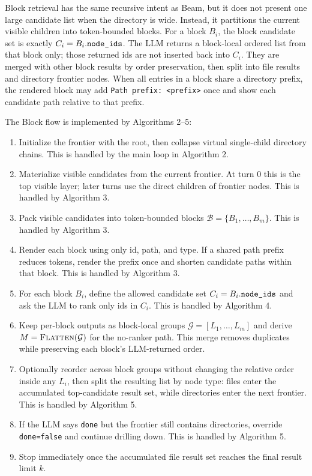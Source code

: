 \documentclass{article}
\begin{document}
Block retrieval has the same recursive intent as Beam, but it does not present
one large candidate list when the directory is wide. Instead, it partitions the
current visible children into token-bounded blocks. For a block $B_i$, the block
candidate set is exactly $C_i = B_i.\text{\texttt{node\_ids}}$. The LLM returns a
block-local ordered list from that block only; those returned ids are not
inserted back into $C_i$. They are merged with other block results by order
preservation, then split into file results and directory frontier nodes.
When all entries in a block share a directory prefix, the rendered block may add
\texttt{Path prefix: <prefix>} once and show each candidate path relative to that
prefix.

The Block flow is implemented by Algorithms 2--5:
\begin{enumerate}
  \item Initialize the frontier with the root, then collapse virtual
  single-child directory chains. This is handled by the main loop in
  Algorithm 2.
  \item Materialize visible candidates from the current frontier. At turn 0 this
  is the top visible layer; later turns use the direct children of frontier
  nodes. This is handled by Algorithm 3.
  \item Pack visible candidates into token-bounded blocks
  $\mathcal{B}=\{B_1,\ldots,B_m\}$. This is handled by Algorithm 3.
  \item Render each block using only id, path, and type. If a shared path prefix
  reduces tokens, render the prefix once and shorten candidate paths within that
  block. This is handled by Algorithm 3.
  \item For each block $B_i$, define the allowed candidate set
  $C_i=B_i.\text{\texttt{node\_ids}}$ and ask the LLM to rank only ids in $C_i$.
  This is handled by Algorithm 4.
  \item Keep per-block outputs as block-local groups
  $\mathcal{G}=[L_1,\ldots,L_m]$ and derive
  $M=\Call{Flatten}{\mathcal{G}}$ for the no-ranker path. This merge removes
  duplicates while preserving each block's LLM-returned order.
  \item Optionally reorder across block groups without changing the relative
  order inside any $L_i$, then split the resulting list by node type: files enter
  the accumulated top-candidate result set, while directories enter the next
  frontier. This is handled by Algorithm 5.
  \item If the LLM says \texttt{done} but the frontier still contains
  directories, override \texttt{done=false} and continue drilling down. This is
  handled by Algorithm 5.
  \item Stop immediately once the accumulated file result set reaches the final
  result limit $k$.
\end{enumerate}
\end{document}
